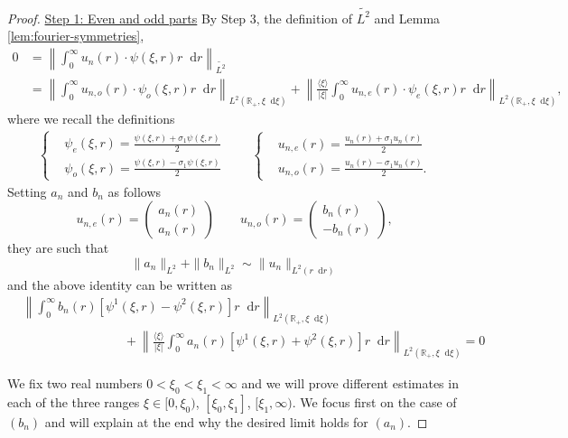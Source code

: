 \documentclass[11 pt]{amsart}
\theoremstyle{definition}
\theoremstyle{remark}
\numberwithin{equation}{section}
\newcommand{\dd}{\mathop{}\!\mathrm{d}}
\begin{document}
\begin{proof} \underline{Step 1: Even and odd parts}
By Step 3, the definition of $\widetilde{L^2}$ and Lemma \ref{lem:fourier-symmetries},
\begin{align*}
 0 & = \left\|  \int_0^\infty u_n (r)\cdot \psi (\xi, r) r \dd r  \right\|_{\widetilde{L^2}} \\
& = \left\|  \int_0^\infty u_{n,o} (r)\cdot \psi_o (\xi, r) r \dd r  \right\|_{L^2 (\mathbb{R}_+,\xi \dd \xi)} + \left\| \frac{\langle \xi \rangle}{|\xi|} \int_0^\infty u_{n,e} (r)\cdot \psi_e (\xi, r) r \dd r  \right\|_{L^2 (\mathbb{R}_+,\xi \dd \xi)},
\end{align*}
where we recall the definitions
\begin{align*}
\begin{cases}
& \psi_e(\xi,r) = \frac{\psi(\xi,r) + \sigma_1 \psi(\xi,r)}{2} \\
&  \psi_o(\xi,r) = \frac{\psi(\xi,r) - \sigma_1 \psi(\xi,r)}{2} 
\end{cases}
\qquad
\begin{cases}
& u_{n,e}(r) = \frac{u_n(r) + \sigma_1 u_n(r)}{2} \\
& u_{n,o}(r) = \frac{u_n(r) -\sigma_1 u_n(r)}{2}.
\end{cases}
\end{align*}
Setting $a_n$ and $b_n$ as follows
$$
 u_{n,e}(r) = \begin{pmatrix} a_n(r) \\ a_n(r) \end{pmatrix} \qquad u_{n,o}(r) = \begin{pmatrix} b_n(r) \\ -b_n(r) \end{pmatrix}  ,
$$
they are such that
$$
\| a_n \|_{L^2} + \| b_n \|_{L^2} \sim \| u_n \|_{L^2(r \dd r)}
$$
and the above identity can be written as
\begin{align*}
& \left\| \int_0^\infty b_n(r)  \left[ \psi^1 (\xi, r)  - \psi^2(\xi,r) \right] r \dd r \right\|_{L^2 (\mathbb{R}_+,\xi \dd \xi)} \\
& \qquad \qquad \qquad \qquad + \left\| \frac{\langle \xi \rangle}{|\xi|}\int_0^\infty a_n(r)  \left[ \psi^1 (\xi, r)  + \psi^2(\xi,r) \right] r \dd r \right\|_{L^2 (\mathbb{R}_+,\xi \dd \xi)} = 0
\end{align*}

 We fix two real numbers $0 < \xi_0 < \xi_1 < \infty$ and we will prove different estimates in each of the three ranges $\xi \in [0,\xi_0)$, $[\xi_0,\xi_1]$, $[\xi_1,\infty)$. We focus first on the case of $(b_n)$ and will explain at the end why the desired limit holds for $(a_n)$.


\end{proof}
\end{document}
